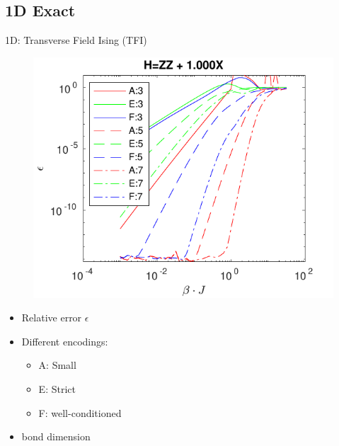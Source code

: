 \subsection{1D Exact}

\begin{frame}{1D: Transverse Field Ising (TFI) }

    \begin{minipage}{.6\textwidth}
        \begin{figure}
            \center
            \includegraphics[height=0.9\textheight]{../Figuren/benchmarking/t_ising_small.pdf}
        \end{figure}
    \end{minipage}
    \begin{minipage}{.39\textwidth}

        \begin{itemize}
            \item Relative error $\epsilon$
            \item Different encodings:
                  \begin{itemize}
                      \item A: Small
                      \item E: Strict
                      \item F: well-conditioned
                  \end{itemize}

            \item bond dimension


\end{itemize}
\end{minipage}
\end{frame}
